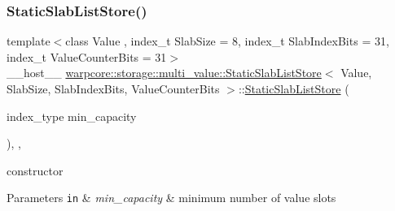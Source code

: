 \subsubsection{\texorpdfstring{Static\+Slab\+List\+Store()}{StaticSlabListStore()}\hspace{0.1cm}{\footnotesize\ttfamily [1/3]}}
{\footnotesize\ttfamily template$<$class Value , index\+\_\+t Slab\+Size = 8, index\+\_\+t Slab\+Index\+Bits = 31, index\+\_\+t Value\+Counter\+Bits = 31$>$ \\
\+\_\+\+\_\+host\+\_\+\+\_\+ \hyperlink{classwarpcore_1_1storage_1_1multi__value_1_1StaticSlabListStore}{warpcore\+::storage\+::multi\+\_\+value\+::\+Static\+Slab\+List\+Store}$<$ Value, Slab\+Size, Slab\+Index\+Bits, Value\+Counter\+Bits $>$\+::\hyperlink{classwarpcore_1_1storage_1_1multi__value_1_1StaticSlabListStore}{Static\+Slab\+List\+Store} (\begin{DoxyParamCaption}\item[{index\+\_\+type}]{min\+\_\+capacity }\end{DoxyParamCaption})\hspace{0.3cm}{\ttfamily [inline]}, {\ttfamily [explicit]}, {\ttfamily [noexcept]}}



constructor 


\begin{DoxyParams}[1]{Parameters}
\mbox{\tt in}  & {\em min\+\_\+capacity} & minimum number of value slots \\
\hline
\end{DoxyParams}
\mbox{\label{classwarpcore_1_1storage_1_1multi__value_1_1StaticSlabListStore_ab235c074c6c6349f56513719376ce09e}} 
